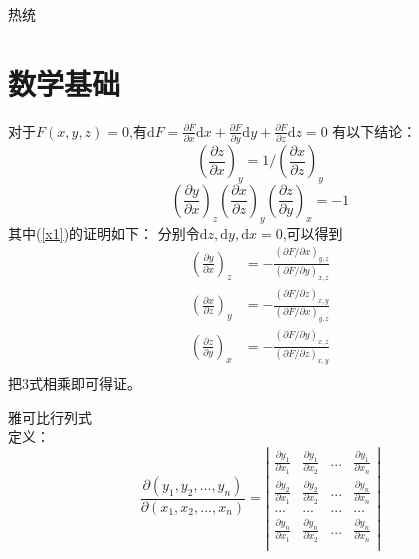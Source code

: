 \documentclass[12pt]{article}
\begin{document}
	热统
	\newpage
	\tableofcontents
	\section{数学基础}
	\par 对于$F(x,y,z)=0$,有$\mathrm{d}F=\frac{\partial F}{\partial x}\mathrm{d}x +\frac{\partial F}{\partial y}\mathrm{d}y + \frac{\partial F}{\partial z}\mathrm{d}z=0$
	\quad 有以下结论：
	\begin{equation}
		(\frac{\partial z}{\partial x})_y=1/(\frac{\partial x}{\partial z})_y
	\end{equation}
\begin{equation}
	(\frac{\partial y}{\partial x})_z (\frac{\partial x}{\partial z})_y (\frac{\partial z}{\partial y})_x =-1
   \label{x1}
\end{equation}
其中(\ref{x1})的证明如下：
 分别令$\mathrm{d}z,\mathrm{d}y,\mathrm{d}x=0$,可以得到
\begin{equation}
	\begin{split}
	(\frac{\partial y}{\partial x})_z&=-\frac{(\partial F/\partial x)_{y,z}}{(\partial F/\partial y)_{x,z}}\\
		(\frac{\partial x}{\partial z})_y&=-\frac{(\partial F/\partial z)_{x,y}}{(\partial F/\partial x)_{y,z}}\\
			(\frac{\partial z}{\partial y})_x&=-\frac{(\partial F/\partial y)_{x,z}}{(\partial F/\partial z)_{x,y}}\\
			\end{split}
\end{equation}
把3式相乘即可得证。
\par 雅可比行列式\\
定义：
\begin{equation}
	\frac{\partial(y_1,y_2,...,y_n)}{\partial(x_1,x_2,...,x_n)}=\left| \begin{matrix}
		\frac{\partial {{y}_{1}}}{\partial {{x}_{1}}} & \frac{\partial {{y}_{1}}}{\partial {{x}_{2}}} & ... & \frac{\partial {{y}_{1}}}{\partial {{x}_{n}}}  \\
		\frac{\partial {{y}_{2}}}{\partial {{x}_{1}}} & \frac{\partial {{y}_{2}}}{\partial {{x}_{2}}} & ... & \frac{\partial {{y}_{n}}}{\partial {{x}_{n}}}  \\
		... & ... & ... & ...  \\
		\frac{\partial {{y}_{n}}}{\partial {{x}_{1}}} & \frac{\partial {{y}_{n}}}{\partial {{x}_{2}}} & ... & \frac{\partial {{y}_{n}}}{\partial {{x}_{n}}}  \\
	\end{matrix} \right|
\end{equation}
\end{document}
